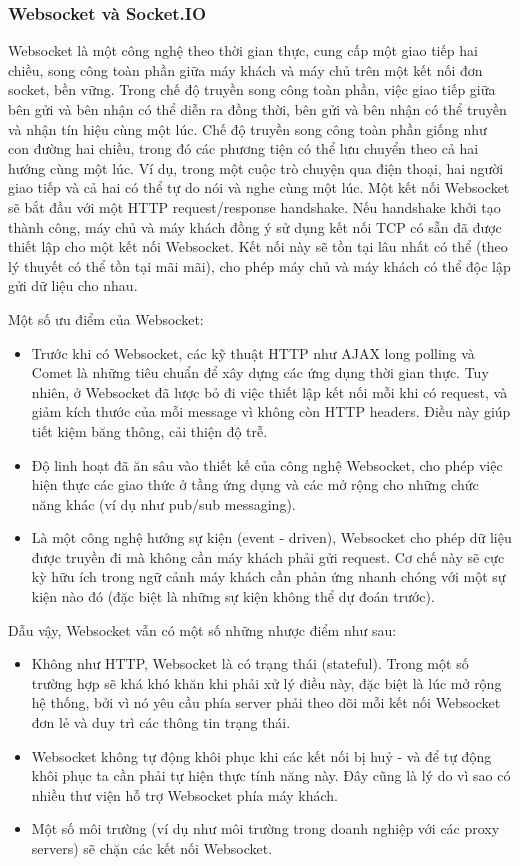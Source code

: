 \subsubsection{Websocket và Socket.IO}
Websocket là một công nghệ theo thời gian thực, cung cấp một giao tiếp hai
chiều, song công toàn phần giữa máy khách và máy chủ trên một kết nối đơn
socket, bền vững. Trong chế độ truyền song công toàn phần, việc giao tiếp giữa
bên gửi và bên nhận có thể diễn ra đồng thời, bên gửi và bên nhận có thể truyền
và nhận tín hiệu cùng một lúc. Chế độ truyền song công toàn phần giống như con
đường hai chiều, trong đó các phương tiện có thể lưu chuyển theo cả hai hướng
cùng một lúc. Ví dụ, trong một cuộc trò chuyện qua điện thoại, hai người giao
tiếp và cả hai có thể tự do nói và nghe cùng một lúc. Một kết nối Websocket sẽ
bắt đầu với một HTTP request/response handshake. Nếu handshake khởi tạo thành
công, máy chủ và máy khách đồng ý sử dụng kết nối TCP có sẵn đã được thiết lập
cho một kết nối Websocket. Kết nối này sẽ tồn tại lâu nhất có thể (theo lý
thuyết có thể tồn tại mãi mãi), cho phép máy chủ và máy khách có thể độc lập
gửi dữ liệu cho nhau.
\par
Một số ưu điểm của Websocket:
\begin{itemize}
    \item Trước khi có Websocket, các kỹ thuật HTTP như AJAX long polling và Comet là
          những tiêu chuẩn để xây dựng các ứng dụng thời gian thực. Tuy nhiên, ở
          Websocket đã lược bỏ đi việc thiết lập kết nối mỗi khi có request, và giảm kích
          thước của mỗi message vì không còn HTTP headers. Điều này giúp tiết kiệm băng
          thông, cải thiện độ trễ.
    \item Độ linh hoạt đã ăn sâu vào thiết kế của công nghệ Websocket, cho phép việc hiện thực các giao thức ở tầng ứng dụng và các mở rộng cho những chức năng khác (ví dụ như pub/sub messaging).
    \item Là một công nghệ hướng sự kiện (event - driven), Websocket cho phép dữ liệu
          được truyền đi mà không cần máy khách phải gửi request. Cơ chế này sẽ cực kỳ
          hữu ích trong ngữ cảnh máy khách cần phản ứng nhanh chóng với một sự kiện nào
          đó (đặc biệt là những sự kiện không thể dự đoán trước).
\end{itemize}
\par
Dẫu vậy, Websocket vẫn có một số những nhược điểm như sau:
\begin{itemize}
    \item Không như HTTP, Websocket là có trạng thái (stateful). Trong một số trường hợp
          sẽ khá khó khăn khi phải xử lý điều này, đặc biệt là lúc mở rộng hệ thống, bởi
          vì nó yêu cầu phía server phải theo dõi mỗi kết nối Websocket đơn lẻ và duy trì
          các thông tin trạng thái.
    \item Websocket không tự động khôi phục khi các kết nối bị huỷ - và để tự động khôi
          phục ta cần phải tự hiện thực tính năng này. Đây cũng là lý do vì sao có nhiều
          thư viện hỗ trợ Websocket phía máy khách.
    \item Một số môi trường (ví dụ như môi trường trong doanh nghiệp với các proxy
          servers) sẽ chặn các kết nối Websocket.
\end{itemize}
